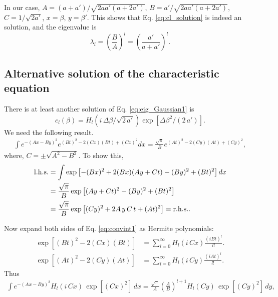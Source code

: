 \documentclass[aip,jcp,preprint,notitlepage, superscriptaddress]{revtex4-1}
\begin{document}
In our case,
$A = (a + a')/\sqrt{2 a a' (a + 2 a')}$,
$B = a'/\sqrt{2 a a' (a + 2 a')}$,
$C = 1/\sqrt{2 a'}$,
$x = \beta$,
$y = \beta'$.
%
This shows that
Eq. \eqref{eq:cl_solution}
is indeed an solution,
and the eigenvalue is
\begin{equation}
\lambda_l
=
\left( \frac{ B }{ A } \right)^l
=
\left( \frac{ a' }{ a + a' } \right)^l.
\end{equation}





\subsection{Alternative solution of the characteristic equation}



There is at least another solution of
Eq. \eqref{eq:eig_Gaussian1}
is
\begin{equation}
c_l(\beta) =
H_l(i \, \Delta\beta/\sqrt{2\,a'})
\exp[
  \Delta \beta^2 / (2 \, a')
].
\label{eq:cl_solution2}
\end{equation}
%
We need the following result.
%
\begin{align}
\int
e^{
  -(A x - B y)^2
}
e^{
  (B t)^2 - 2 (C x) (B t) + (C x)^2
}
d x
=
\frac{ \sqrt \pi } { B }
e^{
  (A t)^2 - 2 (C y) (A t) + (C y)^2
},
\label{eq:convint2}
\end{align}
where,
$C = \pm\sqrt{A^2 - B^2}$.
%
To show this,
%
\begin{align*}
\mathrm{l.h.s.}
&=
\int
\exp\left[
  -(B x)^2 + 2 (B x) (A y + C t)
  -(B y)^2 + (B t)^2
\right]
d x
\notag \\
&=
\frac{ \sqrt \pi } { B }
\exp\left[
  (A y + C t)^2 - (B y)^2 + (B t)^2
\right]
\notag \\
&=
\frac{ \sqrt \pi }{ B }
\exp\left[
  (C y)^2 + 2 A \, y \, C \, t + (A t)^2
\right]
=
\mathrm{r.h.s.}
.
\end{align*}



Now expand both sides of Eq. \eqref{eq:convint1}
as Hermite polynomials:
%
\begin{align*}
\exp\left[
  (B t)^2 - 2 (C x) (B t)
\right]
&=
\sum_{l = 0}^\infty
  H_l(i \, C x) \frac{ (i B t)^l }{ l! }.
\\
\exp\left[
  (A t)^2 - 2 (C y) (A t)
\right]
&=
\sum_{l = 0}^\infty
  H_l(i \, C y) \frac{ (i A t)^l }{ l! }.
\end{align*}
%
Thus
%
\begin{align}
\int
e^{
  -(A x - B y)^2
}
H_l(i \, C x) \,
\exp[ (C x)^2 ] \, d x
=
\frac{ \sqrt \pi } { A }
\left(
  \frac A B
\right)^{l + 1}
H_l(C y) \,
\exp[ (C y)^2 ] \, d y,
\label{eq:convint2_Hermite}
\end{align}
\end{document}
